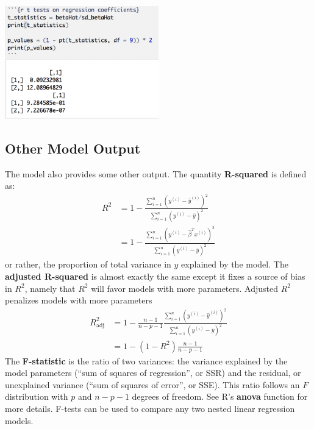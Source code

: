 \begin{center}
\includegraphics[width=0.5\textwidth]{img/t-tests-coefficients.png}
\end{center}

\subsection{Other Model Output}

The model also provides some other output. The quantity \textbf{R-squared} is defined as:
\begin{align*} R^2 &= 1 - \frac{\sum_{i=1}^n (y^{(i)} - \hat{y}^{(i)})^2}{\sum_{i=1}^n (y^{(i)} - \overline{y})^2} \\[3mm]
&=  1 - \frac{\sum_{i=1}^n (y^{(i)} - \hat{\beta}^T x^{(i)})^2}{\sum_{i=1}^n (y^{(i)} - \overline{y})^2} \end{align*}
or rather, the proportion of total variance in $y$ explained by the model. The \textbf{adjusted R-squared} is almost exactly the same except it fixes a source of bias in $R^2$, namely that $R^2$ will favor models with more parameters. Adjusted $R^2$ penalizes models with more parameters
\begin{align*}
 R^2_{\text{adj}} &= 1 - \frac{n-1}{n-p-1} \frac{\sum_{i=1}^n (y^{(i)} - \hat{y}^{(i)})^2}{\sum_{i=1}^n (y^{(i)} - \overline{y})^2} \\[3mm]
 &= 1 - (1 - R^2) \frac{n-1}{n-p-1}
\end{align*}
The \textbf{F-statistic} is the ratio of two variances: the variance explained by the model parameters (``sum of squares of regression'', or SSR) and the residual, or unexplained variance (``sum of squares of error'', or SSE). This ratio follows an $F$ distribution with $p$ and $n-p-1$ degrees of freedom. See R's \textbf{anova} function for more details. F-tests can be used to compare any two nested linear regression models. 
\newpage


